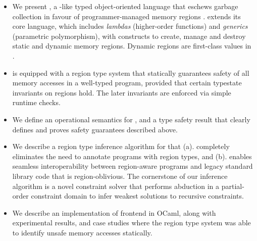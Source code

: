 \begin{itemize} \item We present \name, a \csharp-like typed
object-oriented language that eschews garbage collection in favour of
programmer-managed memory regions . \name extends its core language,
which includes \emph{lambdas} (higher-order functions) and
\emph{generics} (parametric polymorphism), with constructs to create,
manage and destroy static and dynamic memory regions. Dynamic regions
are first-class values in \name.

  \item \name is equipped with a region type system that statically
  guarantees safety of all memory accesses in a well-typed program,
  provided that certain typestate invariants on regions hold.  The
  later invariants are enforced via simple runtime checks.

  \item We define an operational semantics for \name, and a type
  safety result that clearly defines and proves safety guarantees
  described above.

  \item We describe a region type inference algorithm for \name that
  (a). completely eliminates the need to annotate \name programs with
  region types, and (b). enables seamless interoperability between
  region-aware \name programs and legacy standard library code that is
  region-oblivious. The cornerstone of our inference algorithm is a
  novel constraint solver that performs abduction in a partial-order
  constraint domain to infer weakest solutions to recursive
  constraints.

  \item We describe an implementation of \name frontend in OCaml,
  along with experimental results, and case studies where the region
  type system was able to identify unsafe memory accesses statically.
  
\end{itemize}

